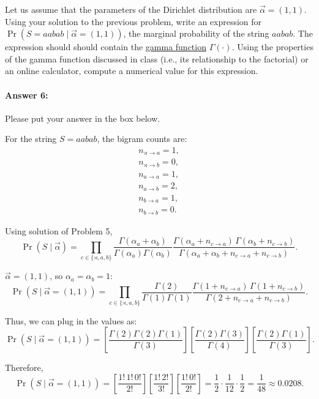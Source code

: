 \documentclass[10pt]{article}
\newenvironment{AnswerBox}{\begin{mdframed}[style=simple]}{\end{mdframed}}
\begin{document}
Let us assume that the parameters of the Dirichlet distribution are
$\vec{\alpha} = (1,1)$. Using your solution to the previous problem,
write an expression for $\Pr(S=aabab\mid \vec \alpha = (1,1))$,
the marginal probability of the string $aabab$.
The expression should should contain the
\href{https://en.wikipedia.org/wiki/Gamma_function}{gamma function}
$\Gamma(\cdot)$. Using the properties of the gamma function discussed
in class (i.e., its relationship to the factorial) or an online
calculator, compute a numerical value for this expression.



\paragraph{Answer 6:} Please put your answer in the box below.


\begin{AnswerBox}%

    For the string $S = aabab$, the bigram counts are:
    \[ \begin{aligned}
    n_{\rtimes \to a} = 1, \\
    n_{\rtimes \to b} = 0, \\
    n_{a \to a} = 1, \\
    n_{a \to b} = 2, \\
    n_{b \to a} = 1, \\
    n_{b \to b} = 0. 
    \end{aligned}
    \]
    
    Using solution of Problem 5,
    \[
    \Pr(S\mid\vec\alpha)
    =
    \prod_{c\in\{\rtimes,a,b\}}
    \frac{\Gamma(\alpha_a+\alpha_b)} {\Gamma(\alpha_a)\Gamma(\alpha_b)}
    \frac{\Gamma(\alpha_a+n_{c\to a})\, \Gamma(\alpha_b+n_{c\to b})} {\Gamma(\alpha_a+\alpha_b+n_{c\to a}+n_{c\to b})}.
    \]
    
    $\vec{\alpha} = (1,1)$, so $\alpha_a=\alpha_b=1$:
    \[
    \Pr(S \mid \vec{\alpha}=(1,1))
    =
    \prod_{c\in\{\rtimes,a,b\}}
    \frac{\Gamma(2)} {\Gamma(1)\Gamma(1)}
    \frac{\Gamma(1+n_{c\to a})\, \Gamma(1+n_{c\to b})} {\Gamma(2+n_{c\to a}+n_{c\to b})}.
    \]
    
    Thus, we can plug in the values as:
    \[
    \Pr(S \mid \vec{\alpha}=(1,1))
    =
    \left[\frac{\Gamma(2)\Gamma(2)\Gamma(1)}{\Gamma(3)}\right]
    \left[\frac{\Gamma(2)\Gamma(3)}{\Gamma(4)}\right]
    \left[\frac{\Gamma(2)\Gamma(1)}{\Gamma(3)}\right].
    \]
    
    Therefore,
    \[
    \Pr(S \mid \vec{\alpha}=(1,1))
    =
    \left[\frac{1!\,1!\,0!}{2!}\right]
    \left[\frac{1!\,2!}{3!}\right]
    \left[\frac{1!\,0!}{2!}\right]
    =
    \frac{1}{2}\cdot\frac{1}{12}\cdot\frac{1}{2}
    =
    \frac{1}{48} \approx 0.0208.
    \]
    
    
\end{AnswerBox}%
\end{document}
